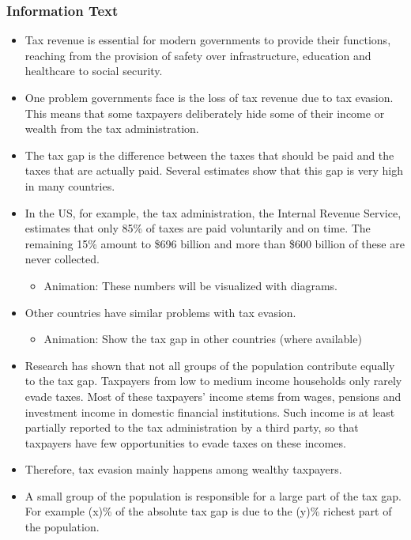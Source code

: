 \documentclass[11pt]{article}
\begin{document}
\subsubsection*{Information Text}
\begin{itemize}
    \item Tax revenue is essential for modern governments to provide their functions, reaching from the provision of safety over infrastructure, education and healthcare to social security.
    \item One problem governments face is the loss of tax revenue due to tax evasion. This means that some taxpayers deliberately hide some of their income or wealth from the tax administration. 
    \item The tax gap is the difference between the taxes that should be paid and the taxes that are actually paid. Several estimates show that this gap is very high in many countries.
    \item In the US, for example, the tax administration, the Internal Revenue Service, estimates that only 85\% of taxes are paid voluntarily and on time. The remaining 15\% amount to \$696 billion and more than \$600 billion of these are never collected.
    \begin{itemize}
    \item Animation: These numbers will be visualized with diagrams.
    \end{itemize}
    \item Other countries have similar problems with tax evasion.
    \begin{itemize}
    \item Animation: Show the tax gap in other countries (where available)
    \end{itemize}
    \item Research has shown that not all groups of the population contribute equally to the tax gap. Taxpayers from low to medium income households only rarely evade taxes. Most of these taxpayers’ income stems from wages, pensions and investment income in domestic financial institutions. Such income is at least partially reported to the tax administration by a third party, so that taxpayers have few opportunities to evade taxes on these incomes. 
    \item Therefore, tax evasion mainly happens among wealthy taxpayers.
    \item A small group of the population is responsible for a large part of the tax gap. For example (x)\% of the absolute tax gap is due to the (y)\% richest part of the population. 

\end{itemize}
\end{document}
